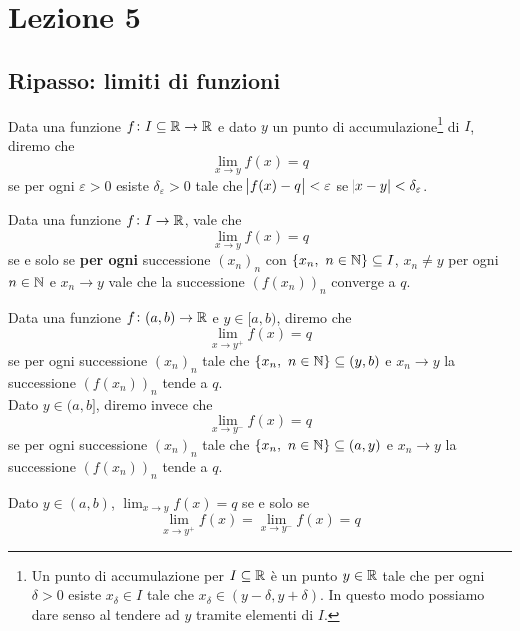 \section{Lezione 5}
\subsection{Ripasso: limiti di funzioni}
\begin{definition}
    \label{def:5.1}
    Data una funzione $f\colon I\subseteq \amsbb{R}\to\amsbb{R}$ e dato $y$ un punto di accumulazione\footnote{Un punto di accumulazione per $I\subseteq \amsbb{R}$ è un punto $y\in\amsbb{R}$ tale che per ogni $\delta>0$ esiste $x_\delta\in I$ tale che $x_\delta \in (y-\delta, y+ \delta)$. In questo modo possiamo dare senso al tendere ad $y$ tramite elementi di $I$.} di $I$, diremo che
    \[
    \lim_{x\to y}f(x) = q
    \]
    se per ogni $\varepsilon>0$ esiste $\delta_\varepsilon>0$ tale che $\abs{f(x)-q}<\varepsilon$ se $\abs{x-y}<\delta_{\varepsilon}$.
\end{definition}
\begin{theorem}
    \label{th:5.1}
    Data una funzione $f\colon I \to\amsbb{R}$, vale che
    \[
    \lim_{x\to y} f(x) = q
    \]
    se e solo se \textbf{per ogni} successione $(x_n)_n$ con $\{x_n, \ n\in\amsbb{N}\}\subseteq I$, $x_n\ne y$ per ogni $n\in\amsbb{N}$ e $x_n \to y$ vale che la successione $(f(x_n))_n$ converge a $q$.
\end{theorem}
\begin{definition}
    \label{def:5.2}
    Data una funzione $f\colon(a,b)\to \amsbb{R}$ e $y\in[a,b)$, diremo che
    \[
    \lim_{x\to y^+} f(x) = q
    \]
    se per ogni successione $(x_n)_n$ tale che $\{x_n, \ n\in\amsbb{N}\}\subseteq (y,b)$ e $x_n \to y$ la successione $(f(x_n))_n $ tende a $q$.\\
    Dato $y\in(a,b]$, diremo invece che
    \[
    \lim_{x\to y^-} f(x) = q
    \]
    se per ogni successione $(x_n)_n$ tale che $\{x_n, \ n\in\amsbb{N}\}\subseteq (a,y)$ e $x_n \to y$ la successione $(f(x_n))_n $ tende a $q$.\\
\end{definition}
\begin{theorem}
    \label{th:5.2}
    Dato $y\in(a,b)$, $\lim_{x\to y} f(x) =q$ se e solo se 
    \[
    \lim_{x\to y^+}f(x) = \lim_{x\to y^-}f(x) = q
    \]
\end{theorem}
